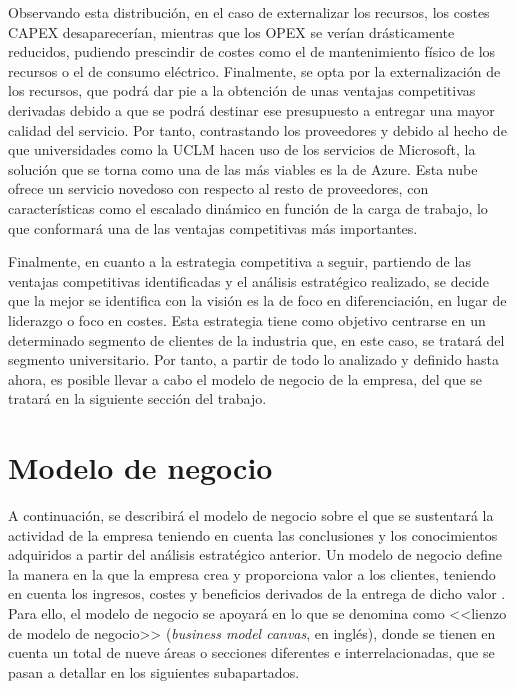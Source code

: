 Observando esta distribución, en el caso de externalizar los recursos, los costes \acs{CAPEX} desaparecerían, mientras que los \acs{OPEX} se verían drásticamente reducidos, pudiendo prescindir de costes como el de mantenimiento físico de los recursos o el de consumo eléctrico. Finalmente, se opta por la externalización de los recursos, que podrá dar pie a la obtención de unas ventajas competitivas derivadas debido a que se podrá destinar ese presupuesto a entregar una mayor calidad del servicio. Por tanto, contrastando los proveedores y debido al hecho de que universidades como la \acs{UCLM} hacen uso de los servicios de Microsoft, la solución que se torna como una de las más viables es la de Azure. Esta nube ofrece un servicio novedoso con respecto al resto de proveedores, con características como el escalado dinámico en función de la carga de trabajo, lo que conformará una de las ventajas competitivas más importantes.

Finalmente, en cuanto a la estrategia competitiva a seguir, partiendo de las ventajas competitivas identificadas y el análisis estratégico realizado, se decide que la mejor se identifica con la visión es la de foco en diferenciación, en lugar de liderazgo o foco en costes. Esta estrategia tiene como objetivo centrarse en un determinado segmento de clientes de la industria que, en este caso, se tratará del segmento universitario. Por tanto, a partir de todo lo analizado y definido hasta ahora, es posible llevar a cabo el modelo de negocio de la empresa, del que se tratará en la siguiente sección del trabajo.


\clearpage


\section{Modelo de negocio}
A continuación, se describirá el modelo de negocio sobre el que se sustentará la actividad de la empresa teniendo en cuenta las conclusiones y los conocimientos adquiridos a partir del análisis estratégico anterior. Un modelo de negocio define la manera en la que la empresa crea y proporciona valor a los clientes, teniendo en cuenta los ingresos, costes y beneficios derivados de la entrega de dicho valor \cite{Teece2010BusinessInnovation}. Para ello, el modelo de negocio se apoyará en lo que se denomina como <<lienzo de modelo de negocio>> (\textit{business model canvas}, en inglés), donde se tienen en cuenta un total de nueve áreas o secciones diferentes e interrelacionadas, que se pasan a detallar en los siguientes subapartados.


